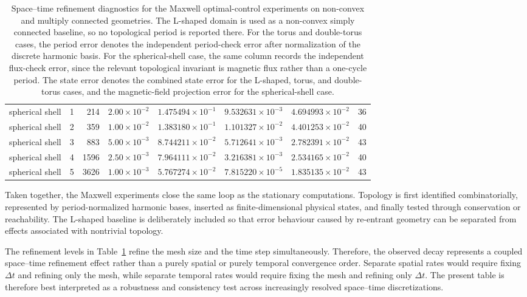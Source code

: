 \documentclass{article}
\begin{document}
\begin{table}[htbp]
{\begin{tabular}{llrrrrrr}
\midrule
spherical shell & 1 & 214  & $2.00\times10^{-2}$ & $1.475494\times10^{-1}$ & $9.532631\times10^{-3}$ & $4.694993\times10^{-2}$ & 36\\
spherical shell & 2 & 359  & $1.00\times10^{-2}$ & $1.383180\times10^{-1}$ & $1.101327\times10^{-2}$ & $4.401253\times10^{-2}$ & 40\\
spherical shell & 3 & 883  & $5.00\times10^{-3}$ & $8.744211\times10^{-2}$ & $5.712641\times10^{-3}$ & $2.782391\times10^{-2}$ & 43\\
spherical shell & 4 & 1596 & $2.50\times10^{-3}$ & $7.964111\times10^{-2}$ & $3.216381\times10^{-3}$ & $2.534165\times10^{-2}$ & 40\\
spherical shell & 5 & 3626 & $1.00\times10^{-3}$ & $5.767274\times10^{-2}$ & $7.815220\times10^{-5}$ & $1.835135\times10^{-2}$ & 43\\
\bottomrule
\end{tabular}%
}
\caption{Space--time refinement diagnostics for the Maxwell optimal-control experiments on non-convex and multiply connected geometries. The L-shaped domain is used as a non-convex simply connected baseline, so no topological period is reported there. For the torus and double-torus cases, the period error denotes the independent period-check error after normalization of the discrete harmonic basis. For the spherical-shell case, the same column records the independent flux-check error, since the relevant topological invariant is magnetic flux rather than a one-cycle period. The state error denotes the combined state error for the L-shaped, torus, and double-torus cases, and the magnetic-field projection error for the spherical-shell case.}
\label{tab:maxwell-refinement}
\end{table}

Taken together, the Maxwell experiments close the same loop as the stationary computations.  Topology is first identified combinatorially, represented by period-normalized harmonic bases, inserted as finite-dimensional physical states, and finally tested through conservation or reachability.  The L-shaped baseline is deliberately included so that error behaviour caused by re-entrant geometry can be separated from effects associated with nontrivial topology.

The refinement levels in Table~\ref{tab:maxwell-refinement} refine the mesh size and the time step simultaneously.  Therefore, the observed decay represents a coupled space--time refinement effect rather than a purely spatial or purely temporal convergence order.  Separate spatial rates would require fixing \(\Delta t\) and refining only the mesh, while separate temporal rates would require fixing the mesh and refining only \(\Delta t\).  The present table is therefore best interpreted as a robustness and consistency test across increasingly resolved space--time discretizations.
\end{document}
